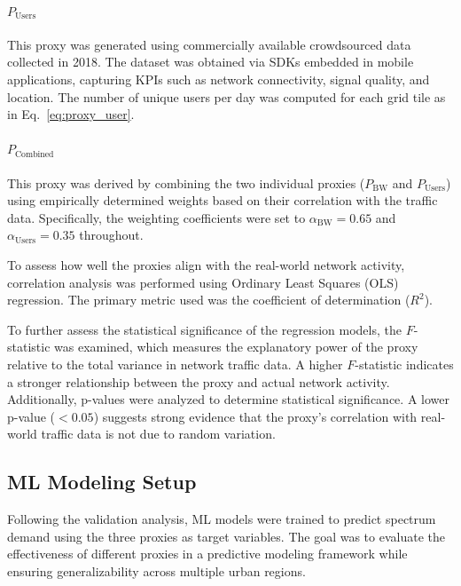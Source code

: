 \documentclass[conference]{IEEEtran}
\begin{document}
\paragraph{\(P_{\text{Users}}\)}
This proxy was generated using commercially available crowdsourced data collected in 2018. The dataset was obtained via SDKs embedded in mobile applications, capturing KPIs such as network connectivity, signal quality, and location. The number of unique users per day was computed for each grid tile as in Eq.~\eqref{eq:proxy_user}. 

\paragraph{\(P_{\text{Combined}}\)}
This proxy was derived by combining the two individual proxies (\(P_{\text{BW}}\) and \(P_{\text{Users}}\)) using empirically determined weights based on their correlation with the traffic data. Specifically, the weighting coefficients were set to \(\alpha_{\text{BW}} = 0.65\) and \(\alpha_{\text{Users}} = 0.35\) throughout.


To assess how well the proxies align with the real-world network activity, correlation analysis was performed using Ordinary Least Squares (OLS) regression. The primary metric used was the coefficient of determination (\(R^2\)).

To further assess the statistical significance of the regression models, the \(F\)-statistic was examined, which measures the explanatory power of the proxy relative to the total variance in network traffic data. A higher \(F\)-statistic indicates a stronger relationship between the proxy and actual network activity. Additionally, p-values were analyzed to determine statistical significance. A lower p-value (\(<0.05\)) suggests strong evidence that the proxy's correlation with real-world traffic data is not due to random variation.

\subsection{ML Modeling Setup}
Following the validation analysis, ML models were trained to predict spectrum demand using the three proxies as target variables. The goal was to evaluate the effectiveness of different proxies in a predictive modeling framework while ensuring generalizability across multiple urban regions.
\end{document}
